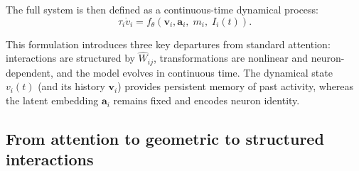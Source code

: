 \documentclass[11pt]{article}
\begin{document}
The full system is then defined as a continuous-time dynamical process:
\begin{equation}
\tau_i \dot{v}_i =
f_\theta\!\left(
\mathbf{v}_i,\mathbf{a}_i,\;
m_i,\;
I_i(t)
\right).
\end{equation}

This formulation introduces three key departures from standard attention: interactions are structured by $\hat{W}_{ij}$, transformations are nonlinear and neuron-dependent, and the model evolves in continuous time. The dynamical state $v_i(t)$ (and its history $\mathbf{v}_i$) provides persistent memory of past activity, whereas the latent embedding $\mathbf{a}_i$ remains fixed and encodes neuron identity.



\subsection{From attention to geometric to structured interactions}
\end{document}

